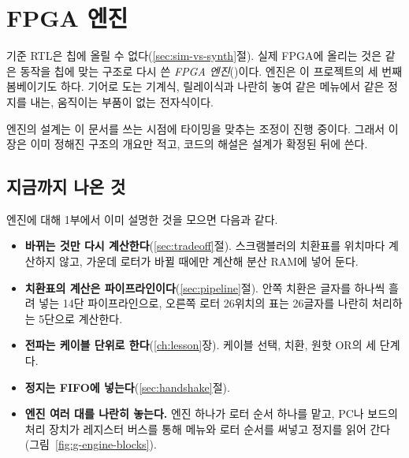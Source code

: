 \chapter{FPGA 엔진}\label{ch:fpga-engine}

기준 RTL은 칩에 올릴 수 없다(\ref{sec:sim-vs-synth}절). 실제 FPGA에 올리는 것은 같은 동작을 칩에 맞는
구조로 다시 쓴 \emph{FPGA 엔진}()이다. 엔진은 이 프로젝트의 세 번째 봄베이기도 하다.
기어로 도는 기계식, 릴레이식과 나란히 놓여 같은 메뉴에서 같은 정지를 내는, 움직이는 부품이 없는 전자식이다.

엔진의 설계는 이 문서를 쓰는 시점에 타이밍을 맞추는 조정이 진행 중이다. 그래서 이 장은 이미 정해진
구조의 개요만 적고, 코드의 해설은 설계가 확정된 뒤에 쓴다.

\section{지금까지 나온 것}

엔진에 대해 1부에서 이미 설명한 것을 모으면 다음과 같다.

\begin{itemize}
\item \textbf{바뀌는 것만 다시 계산한다}(\ref{sec:tradeoff}절). 스크램블러의 치환표를 위치마다 계산하지 않고,
가운데 로터가 바뀔 때에만 계산해 분산 RAM에 넣어 둔다.
\item \textbf{치환표의 계산은 파이프라인이다}(\ref{sec:pipeline}절). 안쪽 치환은 글자를 하나씩 흘려 넣는
14단 파이프라인으로, 오른쪽 로터 26위치의 표는 26글자를 나란히 처리하는 5단으로 계산한다.
\item \textbf{전파는 케이블 단위로 한다}(\ref{ch:lesson}장). 케이블 선택, 치환, 원핫 OR의 세 단계다.
\item \textbf{정지는 FIFO에 넣는다}(\ref{sec:handshake}절).
\item \textbf{엔진 여러 대를 나란히 놓는다.} 엔진 하나가 로터 순서 하나를 맡고, PC나 보드의 처리 장치가
레지스터 버스를 통해 메뉴와 로터 순서를 써넣고 정지를 읽어 간다(그림~\ref{fig:g-engine-blocks}).
\end{itemize}

